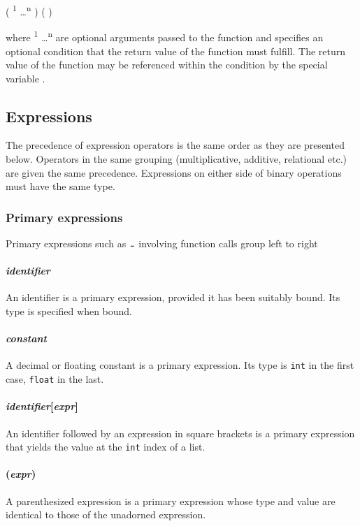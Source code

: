 \quad \term{\midtilde}  ( \textsuperscript{1} \dots {}\textsuperscript{n} ) ( \term{|}  ) 

where  \textsuperscript{1} \dots {}\textsuperscript{n}  are optional arguments passed to the function and \term{|}  specifies an optional condition that the return value of the function must fulfill. The return value of the function may be referenced within the condition by the special variable \term{\$}.

\subsection{Expressions}

The precedence of expression operators is the same order as they are presented below. Operators in the same grouping (multiplicative, additive, relational etc.) are given the same precedence. Expressions on either side of binary operations must have the same type. 

\subsubsection{Primary expressions}
Primary expressions such as $\midtilde$ involving function calls group left to right

\paragraph{\textit{identifier}}
An identifier is a primary expression, provided it has been suitably bound. Its type is specified when bound. 

\paragraph{\textit{constant}}
A decimal or floating constant is a primary expression. Its type is \texttt{int} in the first case, \texttt{float} in the last. 

\paragraph{\textit{identifier}[\textit{expr}]}
An identifier followed by an expression in square brackets is a primary expression that yields the value at the \texttt{int}  index of a list.

\paragraph{(\textit{expr})}
A parenthesized expression is a primary expression whose type and value are identical to those of the unadorned expression. 

